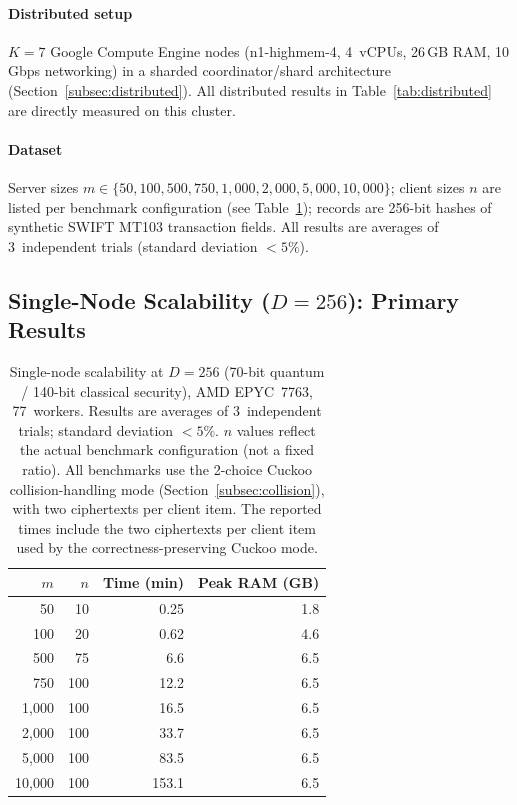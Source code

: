 \documentclass[preprint,12pt]{elsarticle}
\begin{document}
\paragraph{Distributed setup}
$K=7$ Google Compute Engine nodes (n1-highmem-4, 4~vCPUs,
26\,GB RAM, 10\,Gbps networking) in a sharded coordinator/shard architecture
(Section~\ref{subsec:distributed}). All distributed results in
Table~\ref{tab:distributed} are directly measured on this cluster.

\paragraph{Dataset}
Server sizes $m \in \{50, 100, 500, 750, 1{,}000, 2{,}000, 5{,}000, 10{,}000\}$;
client sizes $n$ are listed per benchmark configuration (see Table~\ref{tab:scalability});
records are 256-bit hashes of synthetic SWIFT MT103 transaction fields. All
results are averages of 3~independent trials (standard deviation $< 5\%$).

\subsection{Single-Node Scalability ($D=256$): Primary Results}
\label{subsec:scalability256}

\begin{table}[t]
\centering
\caption{Single-node scalability at $D=256$ (70-bit quantum / 140-bit classical
security), AMD EPYC~7763, 77~workers.
Results are averages of 3~independent trials; standard deviation $<5\%$.
$n$ values reflect the actual benchmark configuration (not a fixed ratio).
All benchmarks use the 2-choice Cuckoo collision-handling mode
(Section~\ref{subsec:collision}), with two ciphertexts per client item.
The reported times include the two ciphertexts per client item used by the
correctness-preserving Cuckoo mode.}
\label{tab:scalability}
\begin{tabular}{@{}r r r r@{}}
\toprule
\textbf{$m$} & \textbf{$n$} & \textbf{Time (min)} & \textbf{Peak RAM (GB)} \\
\midrule
50       &  10 & 0.25   & 1.8 \\
100      &  20 & 0.62   & 4.6 \\
500      &  75 & 6.6    & 6.5 \\
750      & 100 & 12.2   & 6.5 \\
1{,}000  & 100 & 16.5   & 6.5 \\
2{,}000  & 100 & 33.7   & 6.5 \\
5{,}000  & 100 & 83.5   & 6.5 \\
10{,}000 & 100 & 153.1  & 6.5 \\
\bottomrule
\end{tabular}
\end{table}
\end{document}
